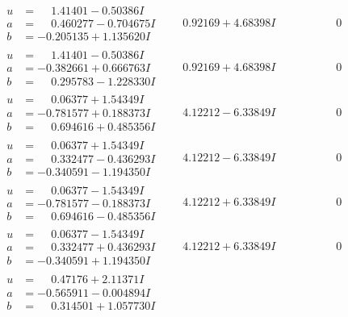 \documentclass[1p]{elsarticle_modified}
\theoremstyle{definition}
\begin{document}
$$\begin{array}{c|c|c}
\begin{aligned}
u &= \phantom{-}1.41401 - 0.50386 I \\
a &= \phantom{-}0.460277 - 0.704675 I \\
b &= -0.205135 + 1.135620 I\end{aligned}
 & \phantom{-}0.92169 + 4.68398 I & \phantom{-0.000000 } 0 \\ \hline\begin{aligned}
u &= \phantom{-}1.41401 - 0.50386 I \\
a &= -0.382661 + 0.666763 I \\
b &= \phantom{-}0.295783 - 1.228330 I\end{aligned}
 & \phantom{-}0.92169 + 4.68398 I & \phantom{-0.000000 } 0 \\ \hline\begin{aligned}
u &= \phantom{-}0.06377 + 1.54349 I \\
a &= -0.781577 + 0.188373 I \\
b &= \phantom{-}0.694616 + 0.485356 I\end{aligned}
 & \phantom{-}4.12212 - 6.33849 I & \phantom{-0.000000 } 0 \\ \hline\begin{aligned}
u &= \phantom{-}0.06377 + 1.54349 I \\
a &= \phantom{-}0.332477 - 0.436293 I \\
b &= -0.340591 - 1.194350 I\end{aligned}
 & \phantom{-}4.12212 - 6.33849 I & \phantom{-0.000000 } 0 \\ \hline\begin{aligned}
u &= \phantom{-}0.06377 - 1.54349 I \\
a &= -0.781577 - 0.188373 I \\
b &= \phantom{-}0.694616 - 0.485356 I\end{aligned}
 & \phantom{-}4.12212 + 6.33849 I & \phantom{-0.000000 } 0 \\ \hline\begin{aligned}
u &= \phantom{-}0.06377 - 1.54349 I \\
a &= \phantom{-}0.332477 + 0.436293 I \\
b &= -0.340591 + 1.194350 I\end{aligned}
 & \phantom{-}4.12212 + 6.33849 I & \phantom{-0.000000 } 0 \\ \hline\begin{aligned}
u &= \phantom{-}0.47176 + 2.11371 I \\
a &= -0.565911 - 0.004894 I \\
b &= \phantom{-}0.314501 + 1.057730 I\end{aligned}

\end{array}$$
\end{document}
